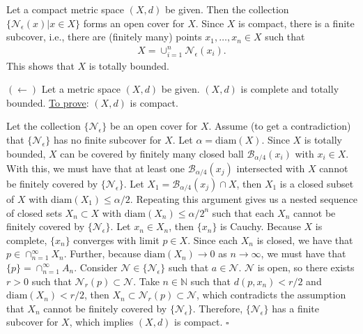 \documentclass{article}
\begin{document}
\begin{enumerate}
\begin{itemize}
		Let a compact metric space $(X,d)$ be given. Then the collection $\{\mathcal{N}_\epsilon(x) | x\in X\}$ forms an open cover for $X$. Since $X$ is compact, there is a finite subcover, i.e., there are (finitely many) points $x_1,\dots,x_n \in X$ such that 
		\begin{align*} 
		X = \cup^n_{i=1} \mathcal{N}_\epsilon(x_i).
		\end{align*}
		This shows that $X$ is totally bounded. 
	\end{itemize}
	
	$(\leftarrow)$ Let a metric space $(X,d)$ be given. $(X,d)$ is complete and totally bounded. \underline{To prove}: $(X,d)$ is compact. 
	
	Let the collection $\{\mathcal{N}_\epsilon\}$ be an open cover for $X$. Assume (to get a contradiction) that $\{\mathcal{N}_\epsilon \}$ has no finite subcover for $X$. Let $\alpha = \text{diam}(X)$. Since $X$ is totally bounded, $X$ can be covered by finitely many closed ball $\mathcal{B}_{\alpha/4}(x_i)$ with $x_i \in X$. With this, we must have that at least one $\mathcal{B}_{\alpha/4}(x_j)$ intersected with $X$ cannot be finitely covered by $\{\mathcal{N}_\epsilon\}$. Let $X_1 = \mathcal{B}_{\alpha/4}(x_j) \cap X$, then $X_1$ is a closed subset of $X$ with $\text{diam}(X_1) \leq \alpha/2$. Repeating this argument gives us a nested sequence of closed sets $X_n \subset X$ with $\text{diam}(X_n) \leq \alpha/2^n$ such that each $X_n$ cannot be finitely covered by $\{\mathcal{N}_\epsilon\}$. Let $x_n \in X_n$, then $\{x_n\}$ is Cauchy. Because $X$ is complete, $\{x_n\}$ converges with limit $p \in X$. Since each $X_n$ is closed, we have that $p \in \cap^\infty_{n=1}X_n$. Further, because $\text{diam}(X_n) \to 0$ as $n\to \infty$, we must have that $\{p\} = \cap^\infty_{n=1}A_n$. Consider $\mathcal{N} \in \{\mathcal{N}_\epsilon\}$ such that $a\in \mathcal{N}$. $\mathcal{N}$ is open, so there exists $r > 0$ such that $\mathcal{N}_r(p) \subset \mathcal{N}$. Take $n\in \mathbb{N}$ such that $d(p,x_n) < r/2$ and $\text{diam}(X_n) < r/2$, then $X_n \subset \mathcal{N}_r(p) \subset \mathcal{N}$, which contradicts the assumption that $X_n$ cannot be finitely covered by $\{\mathcal{N}_\epsilon\}$. Therefore, $\{\mathcal{N}_\epsilon\}$ has a finite subcover for $X$, which implies $(X,d)$ is compact. \hfill $\square$       
\end{enumerate}




\newpage
\end{document}
